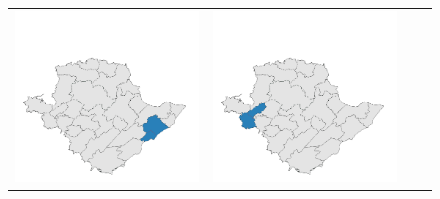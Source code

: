 \begin{figure}[p]
\begin{tabularx}{1\textwidth}{XXXX}
\includegraphics[width=1\linewidth]{images/ch6/mergeoverall/09}&
\includegraphics[width=1\linewidth]{images/ch6/mergeoverall/10}&

\end{tabularx}
\end{figure}
